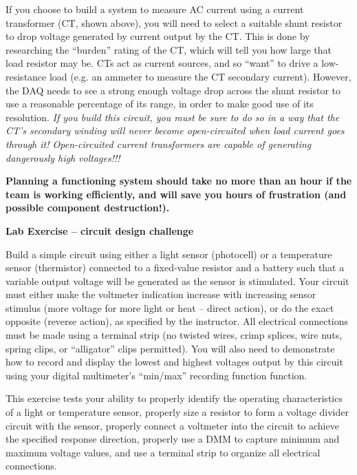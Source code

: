 \documentclass[12pt,a4paper]{article}
\begin{document}
\begin{itemize}
If you choose to build a system to measure AC current using a current transformer (CT, shown above), you will need to select a suitable shunt resistor to drop voltage generated by current output by the CT.  This is done by researching the ``burden'' rating of the CT, which will tell you how large that load resistor may be.  CTs act as current sources, and so ``want'' to drive a low-resistance load (e.g. an ammeter to measure the CT secondary current).  However, the DAQ needs to see a strong enough voltage drop across the shunt resistor to use a reasonable percentage of its range, in order to make good use of its resolution.  {\it If you build this circuit, you must be sure to do so in a way that the CT's secondary winding will never become open-circuited when load current goes through it!  Open-circuited current transformers are capable of generating dangerously high voltages!!!}

\vskip 10pt

{\bf Planning a functioning system should take no more than an hour if the team is working efficiently, and will save you hours of frustration (and possible component destruction!).}




\vfil \eject

\noindent
{\bf Lab Exercise -- circuit design challenge}

\vskip 5pt

Build a simple circuit using either a light sensor (photocell) or a temperature sensor (thermistor) connected to a fixed-value resistor and a battery such that a variable output voltage will be generated as the sensor is stimulated.  Your circuit must either make the voltmeter indication increase with increasing sensor stimulus (more voltage for more light or heat -- direct action), or do the exact opposite (reverse action), as specified by the instructor.  All electrical connections must be made using a terminal strip (no twisted wires, crimp splices, wire nuts, spring clips, or ``alligator'' clips permitted).  You will also need to demonstrate how to record and display the lowest and highest voltages output by this circuit using your digital multimeter's ``min/max'' recording function function.

This exercise tests your ability to properly identify the operating characteristics of a light or temperature sensor, properly size a resistor to form a voltage divider circuit with the sensor, properly connect a voltmeter into the circuit to achieve the specified response direction, properly use a DMM to capture minimum and maximum voltage values, and use a terminal strip to organize all electrical connections.


\end{itemize}
\end{document}
